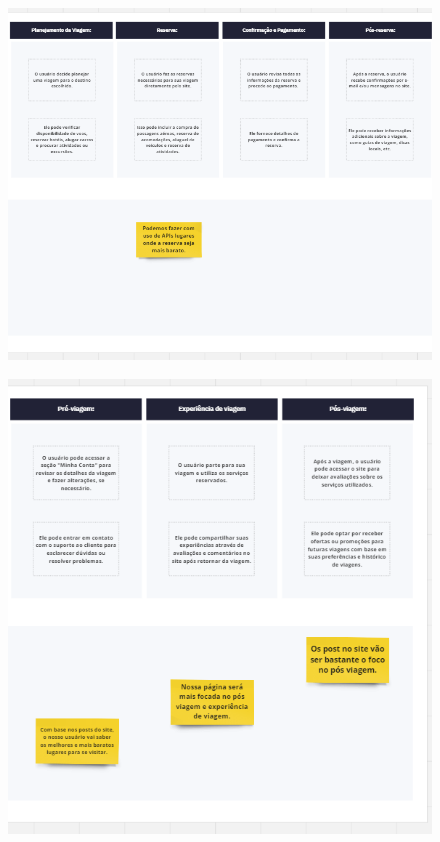 \documentclass{article}
\begin{document}
\begin{figure}[H]
      \centering
      \includegraphics [width=1\textwidth]{IMGDOC/MapaSemA2.png}
      \label{mapa sem a2}
\end{figure}\begin{figure}[H]
      \centering
      \includegraphics [width=1\textwidth]{IMGDOC/MapaSemA3.png}
      \label{mapa sem a3}
\end{figure}
\end{document}

